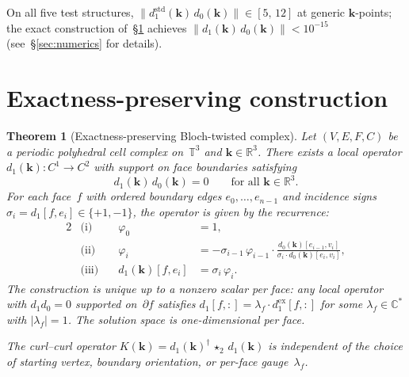 \documentclass[11pt]{article}
\newtheorem{theorem}{Theorem}[section]
\theoremstyle{remark}
\newcommand{\bk}{\mathbf{k}}
\newcommand{\CC}{\mathbb{C}}
\newcommand{\RR}{\mathbb{R}}
\newcommand{\TT}{\mathbb{T}}
\begin{document}
On all five test structures,
$\|d_1^{\mathrm{std}}(\bk)\,d_0(\bk)\| \in [5,\,12]$ at generic
$\bk$-points; the exact construction of~\S\ref{sec:construction}
achieves $\|d_1(\bk)\,d_0(\bk)\| < 10^{-15}$
(see~\S\ref{sec:numerics} for details).

\section{Exactness-preserving construction}\label{sec:construction}

\begin{theorem}[Exactness-preserving Bloch-twisted complex]\label{thm:main}
Let $(V,E,F,C)$ be a periodic polyhedral cell complex on~$\TT^3$ and
$\bk \in \RR^3$. There exists a local operator
$d_1(\bk)\colon C^1 \to C^2$ with support on face boundaries satisfying
\begin{equation}\label{eq:exact}
d_1(\bk)\,d_0(\bk) = 0 \qquad \text{for all } \bk \in \RR^3.
\end{equation}
For each face~$f$ with ordered boundary edges $e_0, \ldots, e_{n-1}$
and incidence signs $\sigma_i = d_1[f,e_i] \in \{+1,-1\}$, the operator
is given by the recurrence:
\begin{alignat}{2}
&\text{(i)}   &\quad \varphi_0 &= 1, \label{eq:rec1}\\
&\text{(ii)}  &\quad \varphi_i &= -\sigma_{i-1}\,\varphi_{i-1}
  \cdot \frac{d_0(\bk)[e_{i-1},v_i]}{\sigma_i \cdot d_0(\bk)[e_i,v_i]},
  \label{eq:rec2}\\
&\text{(iii)} &\quad d_1(\bk)[f,e_i] &= \sigma_i\,\varphi_i. \label{eq:rec3}
\end{alignat}
The construction is unique up to a nonzero scalar per face: any local
operator with $d_1 d_0 = 0$ supported on~$\partial f$ satisfies
$d_1[f,:] = \lambda_f \cdot d_1^{\mathrm{ex}}[f,:]$ for some
$\lambda_f \in \CC^*$ with $|\lambda_f|=1$. The solution space is
one-dimensional per face.

The curl--curl operator $K(\bk) = d_1(\bk)^\dagger\,\star_2\,d_1(\bk)$
is independent of the choice of starting vertex, boundary orientation,
or per-face gauge~$\lambda_f$.
\end{theorem}
\end{document}

